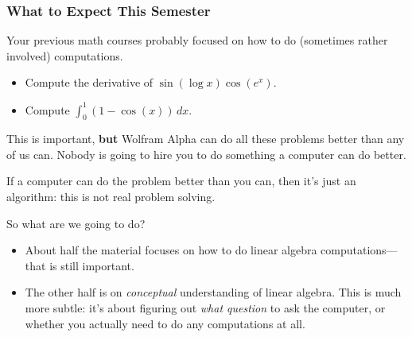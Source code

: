 
\begin{frame}
\frametitle{What to Expect This Semester}

Your previous math courses probably focused on how to do (sometimes rather
involved) computations.
\begin{webonly}
  \begin{itemize}
  \item Compute the derivative of $\sin(\log x)\cos(e^x)$.  
  \item Compute $\int_0^1 (1-\cos(x))\,dx$.
  \end{itemize}
\end{webonly}
\pause\medskip
This is important, \textbf{but} Wolfram Alpha can do all these problems better
than any of us can.
\pause
Nobody is going to hire you to do something a computer can do better.

\pause
\begin{bluebox}{.8\linewidth}
  If a computer can do the problem better than you can, then it's just an
  algorithm: this is not real problem solving.
\end{bluebox}

\pause
So what are we going to do?
\pause
\begin{itemize}
\item About half the material focuses on how to do linear algebra
  computations---that is still important.
\pause
\item The other half is on \emph{conceptual} understanding of linear algebra.
  \pause
  This is much more subtle: it's about figuring out \emph{what question} to ask
  the computer, or whether you actually need to do any computations at all.
\end{itemize}
\end{frame}



